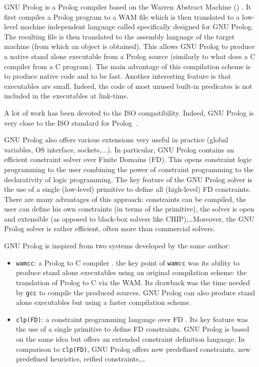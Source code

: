  GNU Prolog is a Prolog compiler
based on the Warren Abstract Machine () \cite{Warren83,Ait-Kaci91}.
It first compiles a Prolog program to a WAM file which is then translated to
a low-level machine independent language called 
specifically designed for GNU Prolog. The resulting file is then translated
to the assembly language of the target machine (from which an object is
obtained). This allows GNU Prolog to produce a native stand alone executable
from a Prolog source (similarly to what does a C compiler from a C program).
The main advantage of this compilation scheme is to produce native code and
to be fast. Another interesting feature is that executables are small.
Indeed, the code of most unused built-in predicates is not included in the
executables at link-time.

A lot of work has been devoted to the ISO compatibility. Indeed, GNU Prolog
is very close to the ISO standard for Prolog~\cite{iso-part1}.

GNU Prolog also offers various extensions very useful in practice (global
variables, OS interface, sockets,...). In particular, GNU Prolog contains an
efficient constraint solver over Finite Domains (FD). This opens constraint
logic programming to the user combining the power of constraint programming to
the declarativity of logic programming. The key feature of the GNU Prolog
solver is the use of a single (low-level) primitive to define all
(high-level) FD constraints. There are many advantages of this approach:
constraints can be compiled, the user can define his own constraints (in
terms of the primitive), the solver is open and extensible (as opposed to
black-box solvers like CHIP),\ldots Moreover, the GNU Prolog solver is rather
efficient, often more than commercial solvers.

GNU Prolog is inspired from two systems developed by the same author:

\begin{itemize}

\item \texttt{wamcc}: a Prolog to C compiler \cite{wamcc}. the key point of \texttt{wamcc} was its
ability to produce stand alone executables using an original compilation
scheme: the translation of Prolog to C via the WAM. Its drawback was the time
needed by \texttt{gcc} to compile the produced sources. GNU Prolog can also
produce stand alone executables but using a faster compilation scheme.

\item \texttt{clp(FD)}: a constraint programming language over FD
\cite{long-clp-fd}. Its key feature was the use of a
single primitive to define FD constraints. GNU Prolog is based on the same
idea but offers an extended constraint definition language. In comparison to
\texttt{clp(FD)}, GNU Prolog offers new predefined constraints, new
predefined heuristics, reified constraints,\ldots

\end{itemize}

